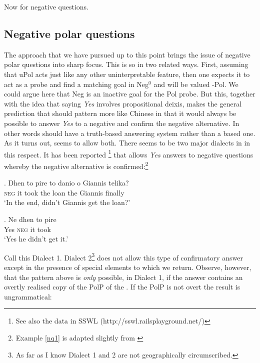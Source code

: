 \documentclass[output=paper]{LSP/langsci}
\begin{document}
Now for negative questions.

\subsection{Negative polar questions}
The approach that we have pursued up to this point brings the issue of negative polar questions into sharp focus.  This is so in two related ways.  First, assuming that uPol acts just like any other uninterpretable feature, then one expects it to act as a probe and find a  matching goal in Neg$^0$ and will be valued -Pol.  We could argue here that Neg is an inactive goal for the Pol probe.  But this, together with the idea that saying \textit{Yes} involves propositional deixis, makes the general prediction that  should pattern more like Chinese in that it would always be possible to answer \textit{Yes} to a negative  and confirm the negative alternative.  In other words  should have a truth-based answering system rather than a  based one.  As it turns out,  seems to allow both. There seems to be two major dialects in  in this respect. \largerpage  
It has been reported \citep{Holton-Mackridge-Philippaki:97}\footnote{See also the data in SSWL (http://sswl.railsplayground.net/)} that  allows \textit{Yes} answers to negative questions whereby the negative alternative is confirmed:\footnote{Example \ref{nq1} is adapted slightly from \citet[414]{Holton-Mackridge-Philippaki:97}}

\exg. 
Dhen to pire to danio o Giannis telika?\\
\textsc{neg} it took the loan the Giannis finally\\  \label{nq1}
\glt `In the end, didn't Giannis get the loan?'

\exg. 
Ne dhen to pire\\
Yes \textsc{neg} it took\\ \label{nq2}
\glt `Yes he didn't get it.'

Call this Dialect 1.  Dialect 2\footnote{As far as I know Dialect 1 and 2 are not geographically circumscribed.} does not allow this type of confirmatory answer except in the presence of special elements to which we return.  
Observe, however, that the pattern above is \textit{only} possible, in Dialect 1, if the answer contains an overtly realised copy of the PolP of the .  If the PolP is not overt the result is ungrammatical:
\end{document}

